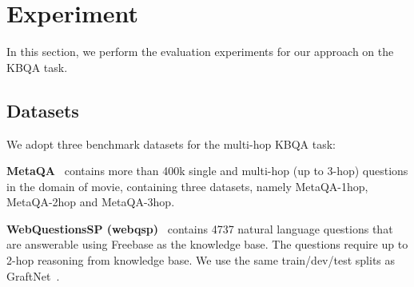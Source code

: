\section{Experiment}
In this section, we perform the evaluation experiments for our approach on the KBQA task. 

\subsection{Datasets}

We adopt three benchmark datasets for the multi-hop KBQA task:


\textbf{MetaQA}~\citep{MetaQA-AAAI-2018} contains more than 400k single and multi-hop (up to 3-hop) questions in the domain of movie, containing three 
datasets, namely MetaQA-1hop, MetaQA-2hop and MetaQA-3hop.






\textbf{WebQuestionsSP (webqsp)}~\citep{webqsp-ACL-2015} contains 4737 natural language questions that are answerable using Freebase as the knowledge base. The questions require up to 2-hop reasoning from knowledge base. We use the same train/dev/test splits as GraftNet~\citep{GraftNet-EMNLP-2018}.


